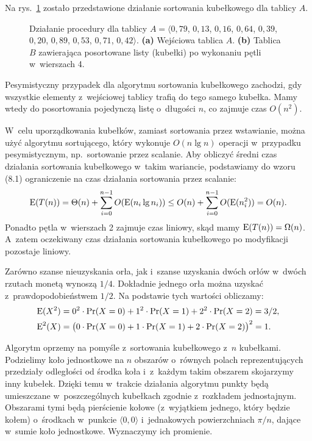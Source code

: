 
\exercise %
Na rys.\ \ref{fig:8.4-1} zostało przedstawione działanie sortowania kubełkowego dla tablicy $A$.
\begin{figure}[!ht]
	\centering 
	\caption{Działanie procedury  dla tablicy $A=\langle0{,}79$, $0{,}13$, $0{,}16$, $0{,}64$, $0{,}39$, $0{,}20$, $0{,}89$, $0{,}53$,\! $0{,}71$,\! $0{,}42\rangle$.
{\sffamily\bfseries(a)} Wejściowa tablica $A$.
{\sffamily\bfseries(b)} Tablica $B$ zawierająca posortowane listy (kubełki) po wykonaniu pętli w~wierszach 4.} \label{fig:8.4-1}
\end{figure}

\exercise %
Pesymistyczny przypadek dla algorytmu sortowania kubełkowego zachodzi, gdy wszystkie elementy z~wejściowej tablicy trafią do tego samego kubełka.
Mamy wtedy do posortowania pojedynczą listę o~długości $n$, co zajmuje czas $O(n^2)$.

W~celu uporządkowania kubełków, zamiast sortowania przez wstawianie, można użyć algorytmu sortującego, który wykonuje $O(n\lg n)$ operacji w~przypadku pesymistycznym, np.\ sortowanie przez scalanie.
Aby obliczyć średni czas działania sortowania kubełkowego w~takim wariancie, podstawiamy do wzoru (8.1) ograniczenie na czas działania sortowania przez scalanie:
\[
	\operatorname{E}(T(n)) = \Theta(n)+\sum_{i=0}^{n-1}O(\operatorname{E}(n_i\lg n_i)) \le O(n)+\sum_{i=0}^{n-1}O(\operatorname{E}(n_i^2)) = O(n).
\]
Ponadto pętla  w~wierszach 2 zajmuje czas liniowy, skąd mamy $\operatorname{E}(T(n))=\Omega(n)$.
A~zatem oczekiwany czas działania sortowania kubełkowego po modyfikacji pozostaje liniowy.

\exercise %
Zarówno szanse nieuzyskania orła, jak i~szanse uzyskania dwóch orłów w~dwóch rzutach monetą wynoszą $1/4$.
Dokładnie jednego orła można uzyskać z~prawdopodobieństwem $1/2$.
Na podstawie tych wartości obliczamy:
\begin{align*}
	\operatorname{E}(X^2) &= 0^2\cdot\Pr(X=0)+1^2\cdot\Pr(X=1)+2^2\cdot\Pr(X=2) = 3/2, \\
	\operatorname{E}^2(X) &= \bigl(0\cdot\Pr(X=0)+1\cdot\Pr(X=1)+2\cdot\Pr(X=2)\bigr)^2 = 1.
\end{align*}

\exercise %
Algorytm oprzemy na pomyśle z~sortowania kubełkowego z~$n$ kubełkami.
Podzielimy koło jednostkowe na $n$ obszarów o~równych polach reprezentujących przedziały odległości od środka koła i~z~każdym takim obszarem skojarzymy inny kubełek.
Dzięki temu w~trakcie działania algorytmu punkty będą umieszczane w~poszczególnych kubełkach zgodnie z~rozkładem jednostajnym.
Obszarami tymi będą pierścienie kołowe (z~wyjątkiem jednego, który będzie kołem) o~środkach w~punkcie $\langle0,0\rangle$ i~jednakowych powierzchniach $\pi/n$, dające w~sumie koło jednostkowe.
Wyznaczymy ich promienie.

